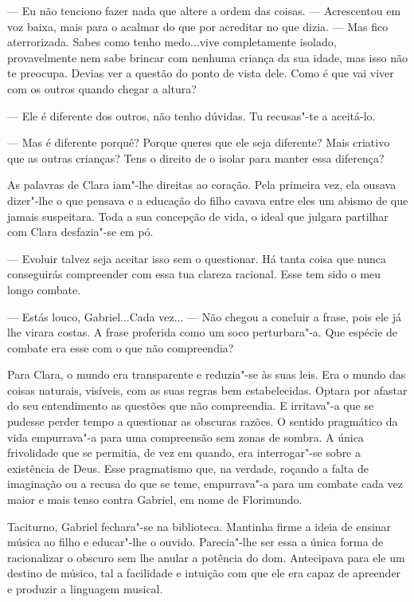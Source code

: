 --- Eu não tenciono fazer nada que altere a ordem das coisas. ---
Acrescentou em voz baixa, mais para o acalmar do que por acreditar no
que dizia. --- Mas fico aterrorizada. Sabes como tenho medo...vive
completamente isolado, provavelmente nem sabe brincar com nenhuma
criança da sua idade, mas isso não te preocupa. Devias ver a questão do
ponto de vista dele. Como é que vai viver com os outros quando chegar a
altura?

--- Ele é diferente dos outros, não tenho dúvidas. Tu recusas"-te a
aceitá-lo.

--- Mas é diferente porquê? Porque queres que ele seja diferente? Mais
criativo que as outras crianças? Tens o direito de o isolar para manter
essa diferença?

As palavras de Clara iam"-lhe direitas ao coração. Pela primeira vez, ela
ousava dizer"-lhe o que pensava e a educação do filho cavava entre eles
um abismo de que jamais suspeitara. Toda a sua concepção de vida, o
ideal que julgara partilhar com Clara desfazia"-se em pó.

--- Evoluir talvez seja aceitar isso sem o questionar. Há tanta coisa que
nunca conseguirás compreender com essa tua clareza racional. Esse tem
sido o meu longo combate.

--- Estás louco, Gabriel...Cada vez... --- Não chegou a concluir a frase,
pois ele já lhe virara costas. A frase proferida como um soco
perturbara"-a. Que espécie de combate era esse com o que não compreendia?

Para Clara, o mundo era transparente e reduzia"-se às suas leis. Era o
mundo das coisas naturais, visíveis, com as suas regras bem
estabelecidas. Optara por afastar do seu entendimento as questões que
não compreendia. E irritava"-a que se pudesse perder tempo a questionar
as obscuras razões. O sentido pragmático da vida empurrava"-a para uma
compreensão sem zonas de sombra. A única frivolidade que se permitia, de
vez em quando, era interrogar"-se sobre a existência de Deus. Esse
pragmatismo que, na verdade, roçando a falta de imaginação ou a recusa
do que se teme, empurrava"-a para um combate cada vez maior e mais tenso
contra Gabriel, em nome de Florimundo.

Taciturno, Gabriel fechara"-se na biblioteca. Mantinha firme a ideia de
ensinar música ao filho e educar"-lhe o ouvido. Parecia"-lhe ser essa a
única forma de racionalizar o obscuro sem lhe anular a potência do dom.
Antecipava para ele um destino de músico, tal a facilidade e intuição
com que ele era capaz de apreender e produzir a linguagem musical.


